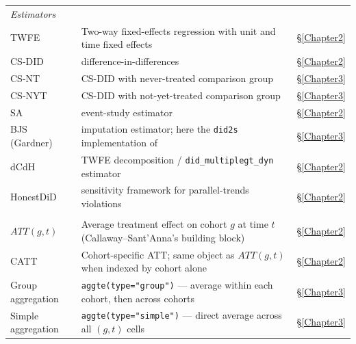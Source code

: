 \begin{small}
\begin{longtable}{@{}p{3.5cm} p{9.5cm} p{2.0cm}@{}}
\multicolumn{3}{l}{\textit{Estimators}} \\
TWFE                              & Two-way fixed-effects regression with unit and time fixed effects                                      & \S\ref{Chapter2} \\
CS-DID                            & \textcite{callaway2021difference} difference-in-differences                                             & \S\ref{Chapter2} \\
CS-NT                             & CS-DID with never-treated comparison group                                                              & \S\ref{Chapter3} \\
CS-NYT                            & CS-DID with not-yet-treated comparison group                                                            & \S\ref{Chapter3} \\
SA                                & \textcite{sun2021estimating} event-study estimator                                                      & \S\ref{Chapter2} \\
BJS (Gardner)                     & \textcite{borusyak2024revisiting} imputation estimator; here the \texttt{did2s} implementation of \textcite{gardner2022two} & \S\ref{Chapter3} \\
dCdH                              & \textcite{dechaisemartin2020twfe} TWFE decomposition / \texttt{did\_multiplegt\_dyn} estimator          & \S\ref{Chapter2} \\
HonestDiD                         & \textcite{rambachan2023more} sensitivity framework for parallel-trends violations                       & \S\ref{Chapter2} \\
\addlinespace
\multicolumn{3}{l}{\textit{Causal parameters and aggregations}} \\
$ATT(g,t)$                        & Average treatment effect on cohort $g$ at time $t$ (Callaway--Sant'Anna's building block)               & \S\ref{Chapter2} \\
CATT                              & Cohort-specific ATT; same object as $ATT(g,t)$ when indexed by cohort alone                             & \S\ref{Chapter2} \\
Group aggregation                 & \texttt{aggte(type="group")} --- average within each cohort, then across cohorts                         & \S\ref{Chapter3} \\
Simple aggregation                & \texttt{aggte(type="simple")} --- direct average across all $(g,t)$ cells                                & \S\ref{Chapter3} \\

\end{longtable}
\end{small}
